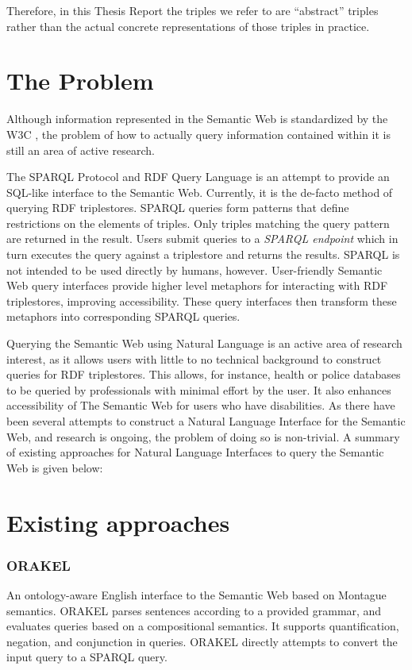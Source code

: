\documentclass[../main.tex]{subfiles}
\begin{document}
Therefore, in this Thesis Report the triples we refer to are ``abstract'' triples rather than the actual concrete representations of those triples in practice.


\section {The Problem}

Although information represented in the Semantic Web is standardized by the W3C \cite{w3csemanticweb}, the problem of how to actually query information contained within it is still an area of active research.

The SPARQL Protocol and RDF Query Language is an attempt to provide an SQL-like interface to the Semantic Web.  Currently, it is the de-facto method of querying RDF triplestores.  SPARQL queries form patterns that define restrictions on the elements of triples.  Only triples matching the query pattern are returned in the result.  Users submit queries to a {\em SPARQL endpoint} which in turn executes the query against a triplestore and returns the results.  SPARQL is not intended to be used directly by humans, however. User-friendly Semantic Web query interfaces provide higher level metaphors for interacting with RDF triplestores, improving accessibility.  These query interfaces then transform these metaphors into corresponding SPARQL queries.

Querying the Semantic Web using Natural Language is an active area of research interest, as it allows users with little to no technical background to construct queries for RDF triplestores.  This allows, for instance, health or police databases to be queried by professionals with minimal effort by the user.  It also enhances accessibility of The Semantic Web for users who have disabilities.  As there have been several attempts to construct a Natural Language Interface for the Semantic Web, and research is ongoing, the problem of doing so is non-trivial.  A summary of existing approaches for Natural Language Interfaces to query the Semantic Web is given below:


\section {Existing approaches}

\subsubsection{ORAKEL}
An ontology-aware English interface to the Semantic Web based on Montague semantics\cite{cimiano2007orakel}.  ORAKEL parses sentences according to a provided grammar,
and evaluates queries based on a compositional semantics.  It supports quantification, negation, and conjunction in queries.  ORAKEL directly attempts to convert the input query to a SPARQL query.
\end{document}
